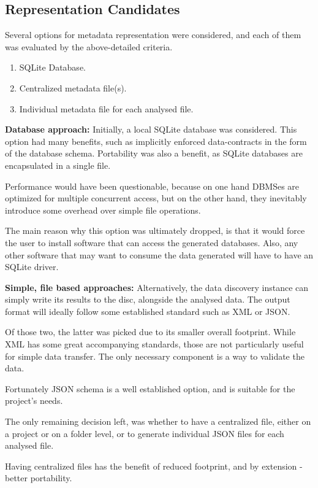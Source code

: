 \subsection{Representation Candidates}

Several options for metadata representation were considered, and each of them was evaluated by the above-detailed criteria.

\begin{enumerate}
    \item SQLite Database.
    \item Centralized metadata file(s).
    \item Individual metadata file for each analysed file.
\end{enumerate}

\textbf{Database approach:}
Initially, a local SQLite database was considered.
This option had many benefits, such as implicitly enforced data-contracts
in the form of the database schema.
Portability was also a benefit, as SQLite databases are encapsulated in a single file.

Performance would have been questionable, because on one hand DBMSes are optimized for multiple concurrent access,
but on the other hand, they inevitably introduce some overhead over simple file operations.

The main reason why this option was ultimately dropped, is that it would force the user to install software that
can access the generated databases.
Also, any other software that may want to consume the data generated will have to have an SQLite driver.

\textbf{Simple, file based approaches:}
Alternatively, the data discovery instance can simply write its results
to the disc, alongside the analysed data.
The output format will ideally follow some established standard such as XML
or JSON.

Of those two, the latter was picked due to its smaller overall footprint.
While XML has some great accompanying standards,
those are not particularly useful for simple data transfer.
The only necessary component is a way to validate the data.

Fortunately JSON schema is a well established option, and is suitable for the project's needs.

The only remaining decision left, was whether to have a centralized file, either on a project or on a folder level,
or to generate individual JSON files for each analysed file.

Having centralized files has the benefit of reduced footprint, and by extension -
better portability.


